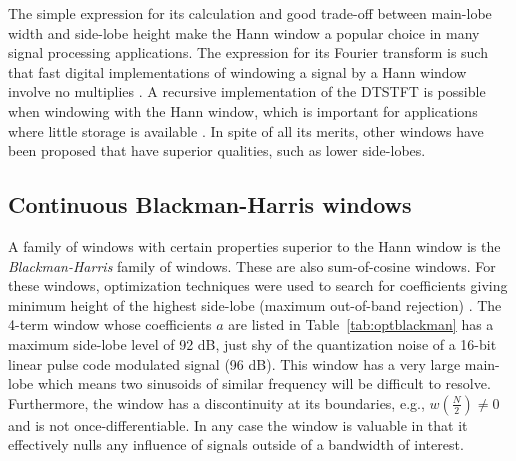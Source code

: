 The simple expression for its calculation and good trade-off between main-lobe
width and side-lobe height make the Hann window a popular choice in many signal
processing applications. The expression for its Fourier transform is such that
fast digital implementations of windowing a signal by a Hann window involve no
multiplies \cite[p.~183]{harris1978use}. A recursive implementation of the
DTSTFT is possible when windowing with the Hann window, which is important for
applications where little storage is available \cite[p.~102]{stankovic2014time}.
In spite of all its merits, other windows have been proposed that have superior
qualities, such as lower side-lobes.

\subsection{Continuous Blackman-Harris windows}

A family of windows with certain properties superior to the Hann window is the
\textit{Blackman-Harris} family of windows. These are also sum-of-cosine
windows. For these windows, optimization techniques were used to search for
coefficients giving minimum height of the highest side-lobe (maximum out-of-band
rejection) \cite{rabiner1970approach}. The 4-term window whose coefficients $a$
are listed in Table~\ref{tab:optblackman} has a maximum side-lobe level of 92
dB, just shy of the quantization noise of a 16-bit linear pulse code modulated
signal (96 dB). This window has a very large main-lobe which means two sinusoids of
similar frequency will be difficult to resolve. Furthermore, the window has a
discontinuity at its boundaries, e.g., $w \left( \frac{N}{2} \right) \neq 0$ and
is not once-differentiable. In any case the window is valuable in that it
effectively nulls any influence of signals outside of a bandwidth of interest.

